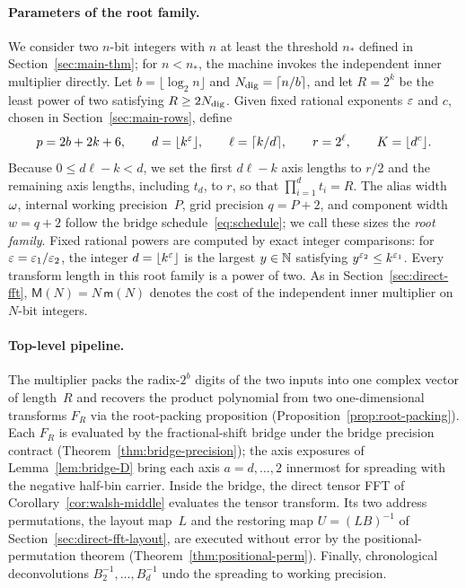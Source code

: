 \paragraph{Parameters of the root family.}
We consider two $n$-bit integers with $n$ at least the threshold $n_*$ defined in Section~\ref{sec:main-thm}; for
$n<n_*$, the machine invokes the independent inner multiplier directly. Let $b=\lfloor\log_2n\rfloor$ and
$N_{\rm dig}=\lceil n/b\rceil$, and let $R=2^k$ be the least power of two satisfying $R\ge2N_{\rm dig}$. Given fixed
rational exponents $\varepsilon$ and $c$, chosen in Section~\ref{sec:main-rows}, define
\begin{equation}\label{eq:root-sizes}
  p=2b+2k+6,\qquad d=\lfloor k^\varepsilon\rfloor,\qquad \ell=\lceil k/d\rceil,\qquad r=2^\ell,\qquad K=\lfloor d^c\rfloor.
\end{equation}
Because $0\le d\ell-k<d$, we set the first $d\ell-k$ axis lengths to $r/2$ and the remaining axis lengths, including
$t_d$, to $r$, so that $\prod_{i=1}^dt_i=R$. The alias width~$\omega$, internal working precision~$P$, grid precision
$q=P+2$, and component width $w=q+2$ follow the bridge schedule~\eqref{eq:schedule}; we call these sizes the \emph{root
family}. Fixed rational powers are computed by exact integer comparisons: for $\varepsilon=\varepsilon_1/\varepsilon_2$, the integer
$d=\lfloor k^\varepsilon\rfloor$ is the largest $y\in\mathbb{N}$ satisfying $y^{\varepsilon_2}\le k^{\varepsilon_1}$. Every transform length in this
root family is a power of two. As in Section~\ref{sec:direct-fft}, $\mathsf M(N)=N\,\mathsf m(N)$ denotes the cost of
the independent inner multiplier on $N$-bit integers.

\paragraph{Top-level pipeline.}
The multiplier packs the radix-$2^b$ digits of the two inputs into one complex vector of length~$R$ and recovers the
product polynomial from two one-dimensional transforms $F_R$ via the root-packing proposition
(Proposition~\ref{prop:root-packing}). Each $F_R$ is evaluated by the fractional-shift bridge under the bridge precision contract
(Theorem~\ref{thm:bridge-precision}); the axis exposures of Lemma~\ref{lem:bridge-D} bring each axis $a=d,\dots,2$
innermost for spreading with the negative half-bin carrier. Inside the bridge, the direct tensor FFT of
Corollary~\ref{cor:walsh-middle} evaluates the tensor transform. Its two address permutations, the layout map~$L$ and the
restoring map $U=(LB)^{-1}$ of Section~\ref{sec:direct-fft-layout}, are executed without error by the
positional-permutation theorem (Theorem~\ref{thm:positional-perm}). Finally, chronological deconvolutions
$B_2^{-1},\dots,B_d^{-1}$ undo the spreading to working precision.

